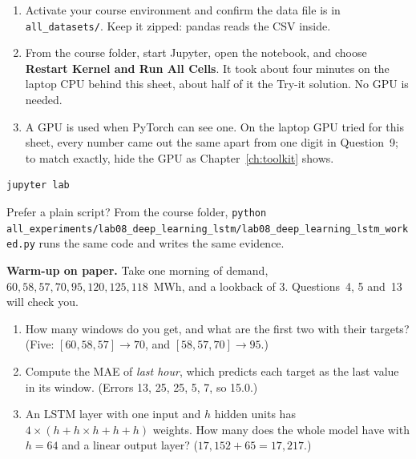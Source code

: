 \begin{labmode}
\begin{enumerate}
  \item Activate your course environment and confirm the data file is in \texttt{all\_datasets/}. Keep it zipped: pandas reads the CSV inside.
  \item From the course folder, start Jupyter, open the notebook, and choose \textbf{Restart Kernel and Run All Cells}. It took about four minutes on the laptop CPU behind this sheet, about half of it the Try-it solution. No GPU is needed.
  \item A GPU is used when PyTorch can see one. On the laptop GPU tried for this sheet, every number came out the same apart from one digit in Question~9; to match exactly, hide the GPU as Chapter~\ref{ch:toolkit} shows.
\end{enumerate}
\begin{lstlisting}[style=utpterminal]
jupyter lab
\end{lstlisting}
Prefer a plain script? From the course folder, \texttt{python all\_experiments/\allowbreak lab08\_deep\_learning\_lstm/\allowbreak lab08\_deep\_learning\_lstm\_worked.py} runs the same code and writes the same evidence.
\end{labmode}

\labroutine

\begin{yourturn}
\textbf{Warm-up on paper.} Take one morning of demand, $60,58,57,70,95,120,125,118$~MWh, and a lookback of 3. Questions~4, 5 and~13 will check you.
\begin{enumerate}
  \item How many windows do you get, and what are the first two with their targets? (Five: $[60,58,57]\to70$, and $[58,57,70]\to95$.)
  \item Compute the MAE of \emph{last hour}, which predicts each target as the last value in its window. (Errors 13, 25, 25, 5, 7, so 15.0.)
  \item An LSTM layer with one input and $h$ hidden units has $4\times(h+h\times h+h+h)$ weights. How many does the whole model have with $h=64$ and a linear output layer? ($17{,}152+65=17{,}217$.)
\end{enumerate}
\end{yourturn}

